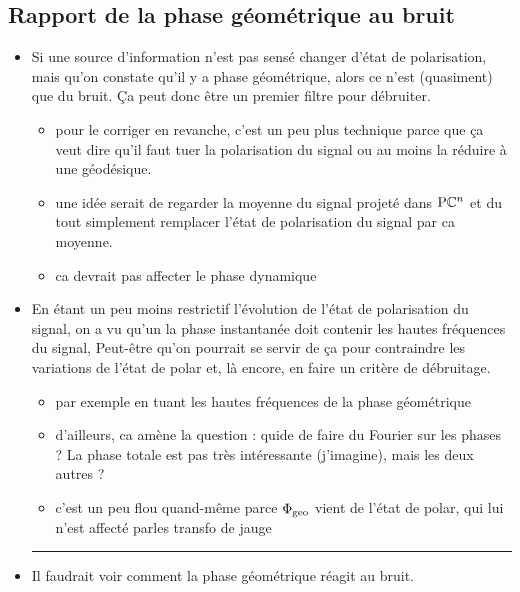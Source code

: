 \subsection{\todo Rapport de la phase géométrique au bruit}\label{subsec:rapportObruit}

\begin{itemize}
	\item Si une source d'information n'est pas sensé changer d'état de polarisation, mais qu'on constate qu'il y a phase géométrique, alors ce n'est (quasiment) que du bruit. Ça peut donc être un premier filtre pour débruiter.
	\begin{itemize}
		
		\item pour le corriger en revanche, c'est un peu plus technique parce que ça veut dire qu'il faut tuer la polarisation du signal ou au moins la réduire à une géodésique.
		
		\item une idée serait de regarder la moyenne du signal projeté dans $\text{\normalfont P}\mathbb{C}^{n}$ et du tout simplement remplacer l'état de polarisation du signal par ca moyenne. 
		
		\item ca devrait pas affecter le phase dynamique	
	\end{itemize}
	
	\item En étant un peu moins restrictif l'évolution de l'état de polarisation du signal, on a vu qu'un la phase instantanée doit contenir les hautes fréquences du signal, Peut-être qu'on pourrait se servir de ça pour contraindre les variations de l'état de polar et, là encore, en faire un critère de débruitage.
	\begin{itemize}
		
		\item  par exemple en tuant les hautes fréquences de la phase géométrique
		
		\item d'ailleurs, ca amène la question : quide de faire du Fourier sur les phases ? La phase totale est pas très intéressante (j'imagine), mais les deux autres ? 
		
		\item c'est un peu flou quand-même parce $\Phi_{\text{\normalfont geo}}$ vient de l'état de polar, qui lui n'est affecté parles transfo de jauge
	\end{itemize}
	
	\hrule

	\item Il faudrait voir comment la phase géométrique réagit au bruit.
	\begin{itemize}
		

\end{itemize}
\end{itemize}
